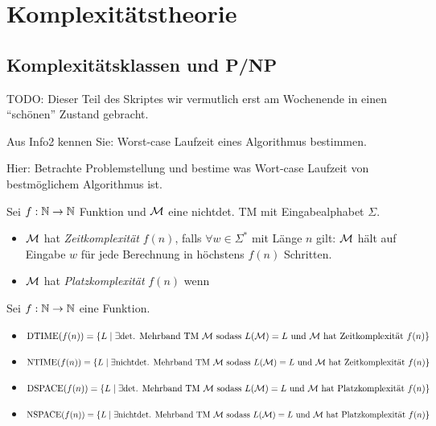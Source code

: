 \section[Komplexitätstheorie]{Komplexitätstheorie}
\subsection{Komplexitätsklassen und P/NP}

{\color{red} TODO: Dieser Teil des Skriptes wir vermutlich erst am Wochenende in einen ``schönen'' Zustand gebracht.}

Aus Info2 kennen Sie: Worst-case Laufzeit eines Algorithmus bestimmen.

Hier: Betrachte Problemstellung und bestime was Wort-case Laufzeit von bestmöglichem Algorithmus ist.

\begin{Def}
Sei $f:\mathbb{N}\rightarrow\mathbb{N}$ Funktion und $\mathcal{M}$ eine nichtdet. \ac{TM} mit Eingabealphabet $\Sigma$.
\begin{itemize}
 \item $\mathcal{M}$ hat \emph{Zeitkomplexität} $f(n)$, falls $\forall w\in\Sigma^*$ mit Länge $n$ gilt: $\mathcal{M}$ hält auf Eingabe $w$ für jede Berechnung in höchstens $f(n)$ Schritten.
 \item $\mathcal{M}$ hat \emph{Platzkomplexität} $f(n)$ wenn
\end{itemize}
\end{Def}


\begin{Def}[name={[$\NTIME$ Klasse]}]
	Sei $f:\N\->\N$ eine Funktion.
	\begin{itemize}
	 \item $\operatorname{DTIME}(f(n)) = \{L\mid \exists \text{det. Mehrband TM $\mathcal{M}$ sodass $L(\mathcal{M})=L$ und $\mathcal{M}$ hat Zeitkomplexität $f(n)$} \} $
	 \item $\operatorname{NTIME}(f(n)) = \{L\mid \exists \text{nichtdet. Mehrband TM $\mathcal{M}$ sodass $L(\mathcal{M})=L$ und $\mathcal{M}$ hat Zeitkomplexität $f(n)$} \} $
	 \item $\operatorname{DSPACE}(f(n)) = \{L\mid \exists \text{det. Mehrband TM $\mathcal{M}$ sodass $L(\mathcal{M})=L$ und $\mathcal{M}$ hat Platzkomplexität $f(n)$} \} $
	 \item $\operatorname{NSPACE}(f(n)) = \{L\mid \exists \text{nichtdet. Mehrband TM $\mathcal{M}$ sodass $L(\mathcal{M})=L$ und $\mathcal{M}$ hat Platzkomplexität $f(n)$} \} $
	\end{itemize}

\end{Def}


